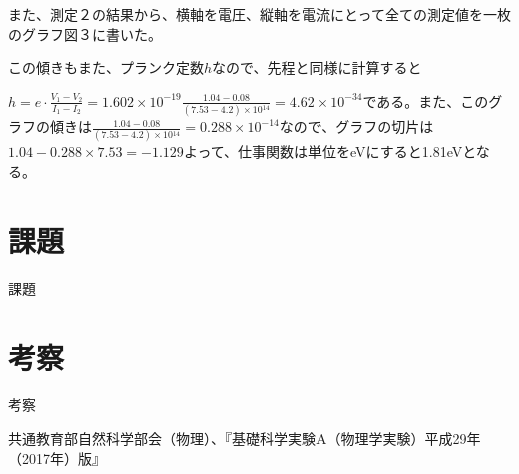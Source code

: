 \documentclass{jsarticle}
\begin{document}
また、測定２の結果から、横軸を電圧、縦軸を電流にとって全ての測定値を一枚のグラフ図３に書いた。

この傾きもまた、プランク定数$h$なので、先程と同様に計算すると\\
\par $h = e\cdot\frac{V_1-V_2}{I_1-I_2} = 1.602\times 10^{-19} \frac{1.04-0.08}{(7.53-4.2)\times 10{^14}} = 4.62\times 10^{-34}$である。また、このグラフの傾きは$\frac{1.04-0.08}{(7.53-4.2)\times 10{^14}} = 0.288\times 10^{-14}$なので、グラフの切片は$1.04 - 0.288\times 7.53 = -1.129$よって、仕事関数は単位をeVにすると1.81eVとなる。

\section{課題}

課題

\section{考察}

考察






\begin{thebibliography}{99}
     共通教育部自然科学部会（物理）、『基礎科学実験A（物理学実験）平成29年（2017年）版』
\end{thebibliography}
\end{document}
